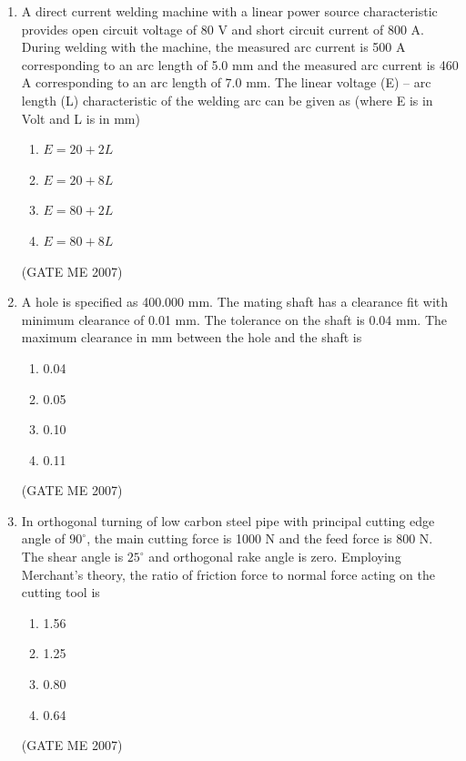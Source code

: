 \documentclass[journal]{IEEEtran}
\begin{document}
\begin{enumerate}
\item A direct current welding machine with a linear power source characteristic provides open circuit voltage of 80 V and short circuit current of 800 A. During welding with the machine, the measured arc current is 500 A corresponding to an arc length of 5.0 mm and the measured arc current is 460 A corresponding to an arc length of 7.0 mm. The linear voltage (E) – arc length (L) characteristic of the welding arc can be given as (where E is in Volt and L is in mm)
\begin{multicols}{4}
\begin{enumerate}
\item $ E = 20 + 2L $
\item $ E = 20 + 8L $
\item $ E = 80 + 2L $
\item $ E = 80 + 8L $
\end{enumerate}
\end{multicols}
\hfill (GATE ME 2007)

\item A hole is specified as 400.000 mm. The mating shaft has a clearance fit with minimum clearance of 0.01 mm. The tolerance on the shaft is 0.04 mm. The maximum clearance in mm between the hole and the shaft is
\begin{multicols}{4}
\begin{enumerate}
\item 0.04
\item 0.05
\item 0.10
\item 0.11
\end{enumerate}
\end{multicols}
\hfill (GATE ME 2007)

\item In orthogonal turning of low carbon steel pipe with principal cutting edge angle of $ 90^\circ $, the main cutting force is 1000 N and the feed force is 800 N. The shear angle is $ 25^\circ $ and orthogonal rake angle is zero. Employing Merchant’s theory, the ratio of friction force to normal force acting on the cutting tool is
\begin{multicols}{4}
\begin{enumerate}
\item 1.56
\item 1.25
\item 0.80
\item 0.64
\end{enumerate}
\end{multicols}
\hfill (GATE ME 2007)


\end{enumerate}
\end{document}
